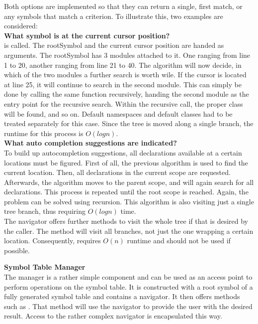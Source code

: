 Both options are implemented so that they can return a single, first match, or any symbols that match a criterion.
To illustrate this, two examples are considered:\\

\textbf{What symbol is at the current cursor position?}\\
 is called.
The rootSymbol and the current cursor position are handed as arguments.
The rootSymbol has 3 modules attached to it.
One ranging from line 1 to 20, another ranging from line 21 to 40.
The algorithm will now decide, in which of the two modules a further search is worth wile.
If the cursor is located at line 25, it will continue to search in the second module.
This can simply be done by calling the same function recursively, handing the second module as the entry point for the recursive search.
Within the recursive call, the proper class will be found, and so on.
Default namespaces and default classes had to be treated separately for this case.
Since the tree is moved along a single branch, the runtime for this process is $O(logn)$.\\

\textbf{What auto completion suggestions are indicated?}\\
To build up autocompletion suggestions, all declarations available at a certain locations must be figured.
First of all, the previous  algorithm is used to find the current location.
Then, all declarations in the current scope are requested.
Afterwards, the algorithm moves to the parent scope, and will again search for all declarations.
This process is repeated until the root scope is reached.
Again, the problem can be solved using recursion.
This algorithm is also visiting just a single tree branch, thus requiring $O(logn)$ time.\\

The navigator offers further methods to visit the whole tree if that is desired by the caller.
The method  will visit all branches, not just the one wrapping a certain location.
Consequently,  requires $O(n)$ runtime and should not be used if possible.\\




\textbf{Symbol Table Manager}\\
The manager is a rather simple component and can be used as an access point to perform operations on the symbol table.
It is constructed with a root symbol of a fully generated symbol table and contains a navigator. 
It then offers methods such as .
That method will use the navigator to provide the user with the desired result.
Access to the rather complex navigator is encapsulated this way.\\


